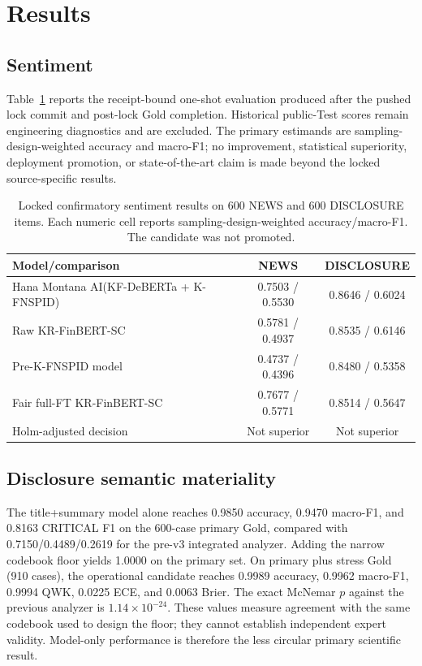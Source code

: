 \documentclass[11pt]{article}
\newcommand{\system}{Hana Montana AI(KF-DeBERTa + K-FNSPID)}
\begin{document}
\section{Results}

\subsection{Sentiment}

Table~\ref{tab:sentiment} reports the receipt-bound one-shot evaluation produced after the pushed lock commit and post-lock Gold completion. Historical public-Test scores remain engineering diagnostics and are excluded. The primary estimands are sampling-design-weighted accuracy and macro-F1; no improvement, statistical superiority, deployment promotion, or state-of-the-art claim is made beyond the locked source-specific results.

\begin{table}[t]
\centering
\small
\begin{tabular}{lcc}
\toprule
Model/comparison & NEWS & DISCLOSURE \\
\midrule
\system{} & 0.7503 / 0.5530 & 0.8646 / 0.6024 \\
Raw KR-FinBERT-SC & 0.5781 / 0.4937 & 0.8535 / 0.6146 \\
Pre-K-FNSPID model & 0.4737 / 0.4396 & 0.8480 / 0.5358 \\
Fair full-FT KR-FinBERT-SC & 0.7677 / 0.5771 & 0.8514 / 0.5647 \\
Holm-adjusted decision & Not superior & Not superior \\
\bottomrule
\end{tabular}
\caption{Locked confirmatory sentiment results on 600 NEWS and 600 DISCLOSURE items. Each numeric cell reports sampling-design-weighted accuracy/macro-F1. The candidate was not promoted.}
\label{tab:sentiment}
\end{table}

\subsection{Disclosure semantic materiality}

The title+summary model alone reaches 0.9850 accuracy, 0.9470 macro-F1, and 0.8163 CRITICAL F1 on the 600-case primary Gold, compared with 0.7150/0.4489/0.2619 for the pre-v3 integrated analyzer. Adding the narrow codebook floor yields 1.0000 on the primary set. On primary plus stress Gold (910 cases), the operational candidate reaches 0.9989 accuracy, 0.9962 macro-F1, 0.9994 QWK, 0.0225 ECE, and 0.0063 Brier. The exact McNemar $p$ against the previous analyzer is $1.14\times10^{-24}$. These values measure agreement with the same codebook used to design the floor; they cannot establish independent expert validity. Model-only performance is therefore the less circular primary scientific result.
\end{document}
